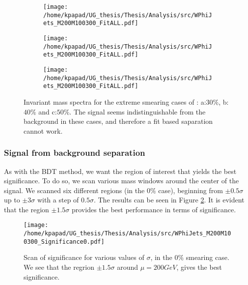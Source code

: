 \begin{figure}[htbp]
\centering
\begin{subfigure}{0.45\textwidth}
\centering
\texttt{[image: /home/kpapad/UG\_thesis/Thesis/Analysis/src/WPhiJets\_M200M100300\_FitALL.pdf]}
\caption{}
\end{subfigure}
\begin{subfigure}{0.45\textwidth}
\centering
\texttt{[image: /home/kpapad/UG\_thesis/Thesis/Analysis/src/WPhiJets\_M200M100300\_FitALL.pdf]}
\caption{}
\end{subfigure}

\begin{subfigure}{0.45\textwidth}
\centering
\texttt{[image: /home/kpapad/UG\_thesis/Thesis/Analysis/src/WPhiJets\_M200M100300\_FitALL.pdf]}
\caption{}
\end{subfigure}
\caption{Invariant mass spectra for the extreme smearing cases of : a:$30\%$, b:$40\%$ and c:$50\%$. The signal seems indistinguishable from the background in these cases, and therefore a fit based saparation cannot work.}
\label{fig:extremeSmearings}
\end{figure}
\subsubsection{Signal from background separation}
\label{sec:orgf26d5e2}
\label{sec:Signal_from_background_separation}
As with the BDT method, we want the region of interest that yields the best significance. To do so, we scan various mass windows around the center of the signal. We scanned six different regions (in the \(0\%\) case), beginning from \(\pm 0.5\sigma\) up to \(\pm 3\sigma\) with a step of \(0.5\sigma\). The results can be seen in Figure \ref{fig:Scan0}. It is evident that the region \(\pm 1.5\sigma\) provides the best performance in terms of significance.
\begin{figure}[h]
\centering
\texttt{[image: /home/kpapad/UG\_thesis/Thesis/Analysis/src/WPhiJets\_M200M100300\_Significance0.pdf]}
\caption{Scan of significance for various values of $\sigma$, in the $0\%$ smearing case. We see that the regrion $\pm 1.5\sigma$ around $\mu=200GeV$, gives the best significance.}
\label{fig:Scan0}
\end{figure}

